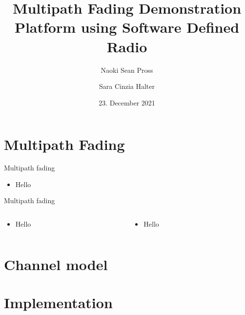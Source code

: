 \documentclass[xetex, onlymath, handout]{beamer}
\title{Multipath Fading Demonstration Platform using Software Defined Radio}
\author{Naoki Sean Pross \and Sara Cinzia Halter}
\date{23. December 2021}
\institute[OST]{OST FHO Campus Rapperswil}
\begin{document}
\frame{
  \maketitle
}

\section{Multipath Fading}

\begin{frame}{Multipath fading}
  \begin{itemize}
    \item Hello
  \end{itemize}
\end{frame}

\begin{frame}{Multipath fading}
  \begin{columns}
    \begin{column}{.5\linewidth}
      \begin{itemize}
        \item Hello
      \end{itemize}
    \end{column}
    \begin{column}{.5\linewidth}
      \begin{itemize}
        \item Hello
      \end{itemize}
    \end{column}
  \end{columns}
\end{frame}

\section{Channel model}

\section{Implementation}
\end{document}
